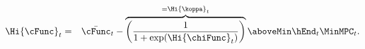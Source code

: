 \begin{eqnarray}
  \Hi{\cFunc}_{t} & = & \bar{\cFunc}_{t}-\overbrace{\left(\frac{1}{1+\exp(\Hi{\chiFunc}_{t})}\right)}^{=\Hi{\koppa}_{t}} \aboveMin \hEnd_{t} \MinMPC_{t}. \label{eq:cFuncHi}
\end{eqnarray}
